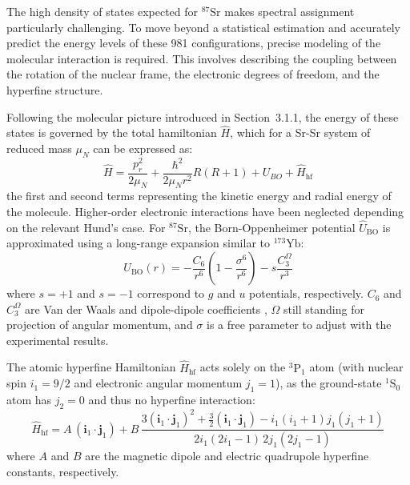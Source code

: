 The high density of states expected for $^{87}\text{Sr}$ makes spectral assignment particularly challenging. To move beyond a statistical estimation and accurately predict the energy levels of these 981 configurations,
 precise modeling of the molecular interaction is required. This involves describing the coupling between the rotation of the nuclear frame, the electronic degrees of freedom, and the hyperfine structure.

Following the molecular picture introduced in Section~3.1.1, the energy of these states is governed by the total hamiltonian $\hat{H}$, which for a Sr-Sr system of reduced mass $\mu_N$ can be expressed as:
\begin{equation}
    \hat{H} = \frac{p_r^2}{2\mu_N} + \frac{\hbar^2}{2\mu_N r^2} R(R+1) + U_{BO} + \hat{H}_{\text{hf}}
    \label{eq:general_hamiltonian_molecule}
\end{equation}
the first and second terms representing the kinetic energy and radial energy of the molecule. Higher-order electronic interactions have been neglected depending on the relevant Hund's case. For $^{87}\text{Sr}$, 
the Born-Oppenheimer potential $\hat{U}_{\text{BO}}$ is approximated using a long-range expansion similar to $^{173}\text{Yb}$:
\begin{equation}
    U_{\text{BO}}(r) = -\frac{C_6}{r^6} \left( 1 - \frac{\sigma^6}{r^6} \right) - s \frac{C_3^{\Omega}}{r^3}
    \label{eq:sr_potential}
\end{equation}
where $s = +1$ and $s = -1$ correspond to $g$ and $u$ potentials, respectively. $C_6$ and $C_3^{\Omega}$ are Van der Waals and dipole-dipole coefficients \cite{borkowski_line_2009}, $\Omega$ still standing for 
projection of angular momentum, and $\sigma$ is a free parameter to adjust with the experimental results.

The atomic hyperfine Hamiltonian $\hat{H}_{\text{hf}}$ acts solely on the $^3\text{P}_1$ atom (with nuclear spin $i_1 = 9/2$ and electronic angular momentum $j_1 = 1$), as the ground-state $^1\text{S}_0$ atom has 
$j_2 = 0$ and thus no hyperfine interaction:
\begin{equation}
    \hat{H}_{\text{hf}} = A \, (\mathbf{i}_1 \cdot \mathbf{j}_1) + B \, \frac{3(\mathbf{i}_1 \cdot \mathbf{j}_1)^2 + \frac{3}{2}(\mathbf{i}_1 \cdot \mathbf{j}_1) - i_1(i_1+1) j_1(j_1+1)}{2 i_1 (2 i_1 - 1) \, 2 j_1 
    (2 j_1 - 1)}
\end{equation}
where $A$ and $B$ are the magnetic dipole and electric quadrupole hyperfine constants, respectively.

